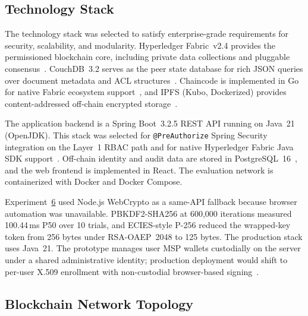 \documentclass{ieeeaccess}
\begin{document}
\subsection{Technology Stack}
\label{sec:stack}

The technology stack was selected to satisfy enterprise-grade requirements
for security, scalability, and modularity. Hyperledger Fabric~v2.4 provides
the permissioned blockchain core, including private data collections and
pluggable consensus~\cite{androulaki2018hyperledger}. CouchDB~3.2 serves as
the peer state database for rich JSON queries over document metadata and ACL
structures~\cite{fabricCouchDBStateDB_v24}. Chaincode is implemented in Go
for native Fabric ecosystem support~\cite{fabricChaincodeLifecycleDoc}, and
IPFS (Kubo, Dockerized) provides content-addressed off-chain encrypted
storage~\cite{benet2014ipfs}.

The application backend is a Spring Boot~3.2.5 REST API running on
Java~21 (OpenJDK). This stack was selected for
\texttt{@PreAuthorize} Spring Security integration on the Layer~1 RBAC path
and for native Hyperledger Fabric Java SDK support~\cite{springBoot325}.
Off-chain identity and audit data are stored in PostgreSQL~16~\cite{postgresqlTriggers},
and the web frontend is implemented in React. The evaluation network is
containerized with Docker and Docker Compose.

Experiment~\hyperref[sec:exp_crypto]{6} used Node.js WebCrypto as a same-API fallback because browser
automation was unavailable. PBKDF2-SHA256 at 600,000 iterations measured
100.44\,ms P50 over 10 trials, and ECIES-style P-256 reduced the wrapped-key
token from 256 bytes under RSA-OAEP~2048 to 125 bytes. The production stack
uses Java~21. The prototype manages user MSP wallets custodially on the
server under a shared administrative identity; production deployment would
shift to per-user X.509 enrollment with non-custodial browser-based
signing~\cite{fabricSdkNode_wallet,fabricCADoc}.

\subsection{Blockchain Network Topology}
\label{sec:topology}
\end{document}
